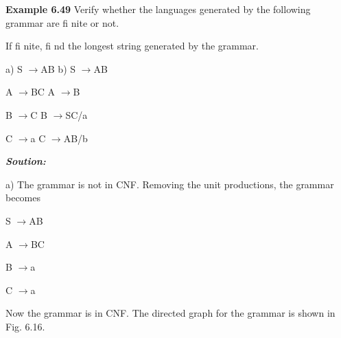 \noindent \textbf{Example 6.49 }Verify whether the languages generated by the following grammar are fi nite or not.

\noindent If fi nite, fi nd the longest string generated by the grammar. 

\noindent 

\noindent a) S $\to $AB  b) S $\to $AB

A $\to $BC   A $\to $B

B $\to $C   B $\to $SC/a

C $\to $a   C $\to $AB/b

\noindent 

\noindent \textbf{\textit{Soution:}}

\noindent a) The grammar is not in CNF. Removing the unit productions, the grammar becomes

\noindent S $\to $AB

\noindent A $\to $BC

\noindent B $\to $a

\noindent C $\to $a

\noindent Now the grammar is in CNF. The directed graph for the grammar is shown in Fig. 6.16.

